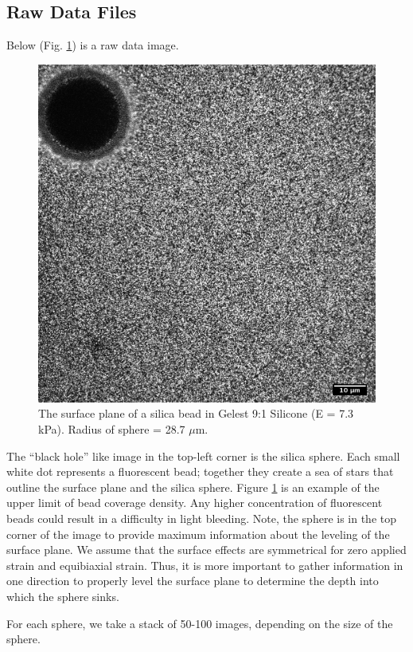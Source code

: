 \subsection{Raw Data Files}
Below (Fig. \ref{fig:190215g91glasssphere011surface}) is a raw data image.
\begin{figure}[h!]
	\centering
	\includegraphics[width=.75\linewidth]{Chapters/Figures/190215_g91_glass_sphere011_surface.png}
	\caption[The surface plane of a silica bead in silcone]{The surface plane of a silica bead in Gelest 9:1 Silicone (E = 7.3 kPa). Radius of sphere = 28.7 $\mu$m.}
	\label{fig:190215g91glasssphere011surface}
\end{figure}
The ``black hole'' like image in the top-left corner is the silica sphere. Each small white dot represents a fluorescent bead; together they create a sea of stars that outline the surface plane and the silica sphere. Figure \ref{fig:190215g91glasssphere011surface} is an example of the upper limit of bead coverage density. Any higher concentration of fluorescent beads could result in a difficulty in light bleeding. Note, the sphere is in the top corner of the image to provide maximum information about the leveling of the surface plane. We assume that the surface effects are symmetrical for zero applied strain and equibiaxial strain. Thus, it is more important to gather information in one direction to properly level the surface plane to determine the depth into which the sphere sinks. 

For each sphere, we take a stack of 50-100 images, depending on the size of the sphere. 

